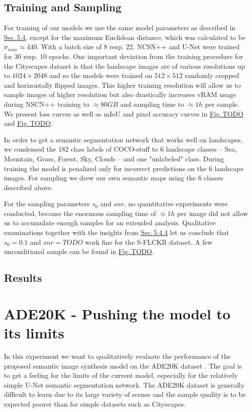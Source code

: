 \subsection{Training and Sampling}
For training of our models we use the same model parameters as described in \hyperref[sec:5.4]{Sec.\,5.4}, except for the maximum Euclidean distance, which was calculated to be $\sigma_{max}\approx440$. With a batch size of $8$ resp. $22$, NCSN++ and U-Net were trained for $30$ resp. $10$ epochs. One important deviation from the training procedure for the Cityscapes dataset is that the landscape images are of various resolutions up to $1024\times2048$ and so the models were trained on $512\times512$ randomly cropped and horizontally flipped images. This higher training resolution will allow us to sample images of higher resolution but also drastically increases vRAM usage during NSCN++ training to $\approx80GB$ and sampling time to $\approx1h$ per sample. We present loss curves as well as mIoU and pixel accuracy curves in \hyperref[fig:]{Fig.\,TODO} and \hyperref[fig:]{Fig.\,TODO}.

In order to get a semantic segmentation network that works well on landscapes, we condensed the $182$ class labels of COCO-stuff to $6$ landscape classes – Sea, Mountain, Grass, Forest, Sky, Clouds – and one "unlabeled" class. During training the model is penalized only for incorrect predictions on the $6$ landscape images. For sampling we drew our own semantic maps using the $6$ classes described above.

For the sampling parameters $s_0$ and $snr$, no quantitative experiments were conducted, because the enormous sampling time of $\approx1h$ per image did not allow us to accumulate enough samples for an extended analysis. Qualitative examinations together with the insights from \hyperref[sec:5.4.4]{Sec.\,5.4.4} let us conclude that $s_0=0.1$ and $snr=TODO$ work fine for the S-FLCKR dataset. A few unconditional sample can be found in \hyperref[fig:]{Fig.\,TODO}.
%
\subsection{Results}

\section[ADE20K - Pushing the model to its limits]{ADE20K - Pushing the model to its limits%
    } \label{sec:5.6}
In this experiment we want to qualitatively evaluate the performance of the proposed semantic image synthesis model on the ADE20K dataset \cite{ade20k}. The goal is to get a feeling for the limits of the current model, especially for the relatively simple U-Net semantic segmentation network. The ADE20K dataset is generally difficult to learn due to its large variety of scenes and the sample quality is to be expected poorer than for simple datasets such as Cityscapes. 
